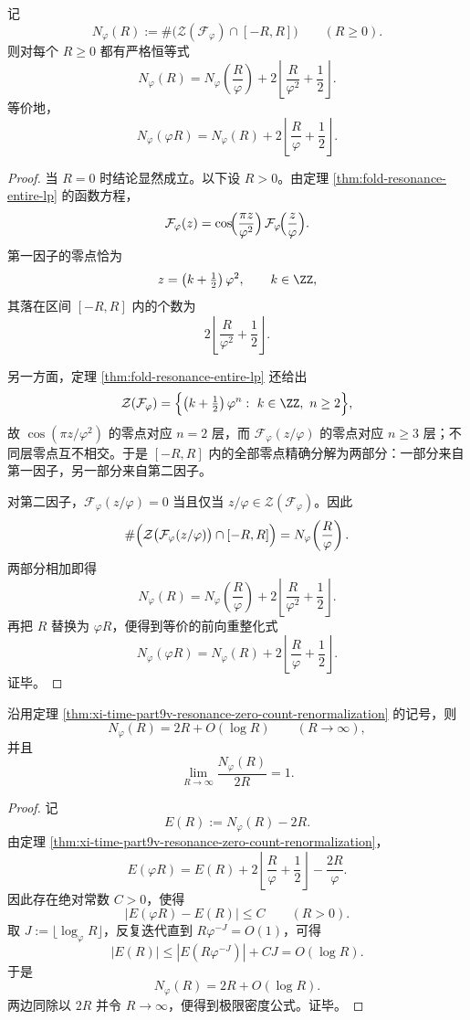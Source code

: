 \begin{theorem}[共振零点计数的精确重整化方程]\label{thm:xi-time-part9v-resonance-zero-count-renormalization}
记
\[
N_\varphi(R):=\#\bigl(\mathcal Z(\mathcal F_\varphi)\cap[-R,R]\bigr)
\qquad (R\ge 0).
\]
则对每个 \(R\ge 0\) 都有严格恒等式
\[
N_\varphi(R)
=
N_\varphi\!\left(\frac{R}{\varphi}\right)
+
2\left\lfloor \frac{R}{\varphi^2}+\frac12\right\rfloor.
\]
等价地，
\[
N_\varphi(\varphi R)
=
N_\varphi(R)
+
2\left\lfloor \frac{R}{\varphi}+\frac12\right\rfloor.
\]
\end{theorem}
\begin{proof}
当 \(R=0\) 时结论显然成立。以下设 \(R>0\)。由定理 \ref{thm:fold-resonance-entire-lp} 的函数方程，
\[
\mathcal F_\varphi(z)
=
\cos\!\Bigl(\frac{\pi z}{\varphi^2}\Bigr)\,
\mathcal F_\varphi\!\Bigl(\frac{z}{\varphi}\Bigr).
\]
第一因子的零点恰为
\[
z=\left(k+\tfrac12\right)\varphi^2,
\qquad
k\in\ZZ,
\]
其落在区间 \([-R,R]\) 内的个数为
\[
2\left\lfloor \frac{R}{\varphi^2}+\frac12\right\rfloor.
\]

另一方面，定理 \ref{thm:fold-resonance-entire-lp} 还给出
\[
\mathcal Z(\mathcal F_\varphi)
=
\Bigl\{\left(k+\tfrac12\right)\varphi^n:\ k\in\ZZ,\ n\ge 2\Bigr\},
\]
故 \(\cos(\pi z/\varphi^2)\) 的零点对应 \(n=2\) 层，而 \(\mathcal F_\varphi(z/\varphi)\) 的零点对应 \(n\ge 3\) 层；不同层零点互不相交。于是 \([-R,R]\) 内的全部零点精确分解为两部分：一部分来自第一因子，另一部分来自第二因子。

对第二因子，\(\mathcal F_\varphi(z/\varphi)=0\) 当且仅当 \(z/\varphi\in \mathcal Z(\mathcal F_\varphi)\)。因此
\[
\#\Bigl(\mathcal Z\bigl(\mathcal F_\varphi(z/\varphi)\bigr)\cap[-R,R]\Bigr)
=
N_\varphi\!\left(\frac{R}{\varphi}\right).
\]
两部分相加即得
\[
N_\varphi(R)
=
N_\varphi\!\left(\frac{R}{\varphi}\right)
+
2\left\lfloor \frac{R}{\varphi^2}+\frac12\right\rfloor.
\]
再把 \(R\) 替换为 \(\varphi R\)，便得到等价的前向重整化式
\[
N_\varphi(\varphi R)
=
N_\varphi(R)
+
2\left\lfloor \frac{R}{\varphi}+\frac12\right\rfloor.
\]
证毕。
\end{proof}

\begin{corollary}[共振零点的线性密度律]\label{cor:xi-time-part9v-resonance-zero-density-linear}
沿用定理 \ref{thm:xi-time-part9v-resonance-zero-count-renormalization} 的记号，则
\[
N_\varphi(R)=2R+O(\log R)
\qquad (R\to\infty),
\]
并且
\[
\lim_{R\to\infty}\frac{N_\varphi(R)}{2R}=1.
\]
\end{corollary}
\begin{proof}
记
\[
E(R):=N_\varphi(R)-2R.
\]
由定理 \ref{thm:xi-time-part9v-resonance-zero-count-renormalization}，
\[
E(\varphi R)
=
E(R)+
2\left\lfloor \frac{R}{\varphi}+\frac12\right\rfloor
-
\frac{2R}{\varphi}.
\]
因此存在绝对常数 \(C>0\)，使得
\[
|E(\varphi R)-E(R)|\le C
\qquad (R>0).
\]
取 \(J:=\lfloor \log_\varphi R\rfloor\)，反复迭代直到 \(R\varphi^{-J}=O(1)\)，可得
\[
|E(R)|\le |E(R\varphi^{-J})|+CJ=O(\log R).
\]
于是
\[
N_\varphi(R)=2R+O(\log R).
\]
两边同除以 \(2R\) 并令 \(R\to\infty\)，便得到极限密度公式。证毕。
\end{proof}

